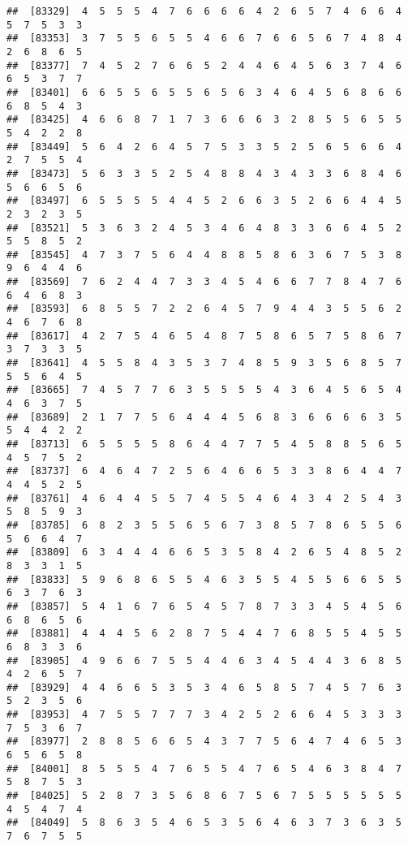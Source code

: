 \documentclass[
]{book}
\begin{document}
\begin{verbatim}
##  [83329]  4  5  5  5  4  7  6  6  6  6  4  2  6  5  7  4  6  6  4  5  7  5  3  3
##  [83353]  3  7  5  5  6  5  5  4  6  6  7  6  6  5  6  7  4  8  4  2  6  8  6  5
##  [83377]  7  4  5  2  7  6  6  5  2  4  4  6  4  5  6  3  7  4  6  6  5  3  7  7
##  [83401]  6  6  5  5  6  5  5  6  5  6  3  4  6  4  5  6  8  6  6  6  8  5  4  3
##  [83425]  4  6  6  8  7  1  7  3  6  6  6  3  2  8  5  5  6  5  5  5  4  2  2  8
##  [83449]  5  6  4  2  6  4  5  7  5  3  3  5  2  5  6  5  6  6  4  2  7  5  5  4
##  [83473]  5  6  3  3  5  2  5  4  8  8  4  3  4  3  3  6  8  4  6  5  6  6  5  6
##  [83497]  6  5  5  5  5  4  4  5  2  6  6  3  5  2  6  6  4  4  5  2  3  2  3  5
##  [83521]  5  3  6  3  2  4  5  3  4  6  4  8  3  3  6  6  4  5  2  5  5  8  5  2
##  [83545]  4  7  3  7  5  6  4  4  8  8  5  8  6  3  6  7  5  3  8  9  6  4  4  6
##  [83569]  7  6  2  4  4  7  3  3  4  5  4  6  6  7  7  8  4  7  6  6  4  6  8  3
##  [83593]  6  8  5  5  7  2  2  6  4  5  7  9  4  4  3  5  5  6  2  4  6  7  6  8
##  [83617]  4  2  7  5  4  6  5  4  8  7  5  8  6  5  7  5  8  6  7  3  7  3  3  5
##  [83641]  4  5  5  8  4  3  5  3  7  4  8  5  9  3  5  6  8  5  7  5  5  6  4  5
##  [83665]  7  4  5  7  7  6  3  5  5  5  5  4  3  6  4  5  6  5  4  4  6  3  7  5
##  [83689]  2  1  7  7  5  6  4  4  4  5  6  8  3  6  6  6  6  3  5  5  4  4  2  2
##  [83713]  6  5  5  5  5  8  6  4  4  7  7  5  4  5  8  8  5  6  5  4  5  7  5  2
##  [83737]  6  4  6  4  7  2  5  6  4  6  6  5  3  3  8  6  4  4  7  4  4  5  2  5
##  [83761]  4  6  4  4  5  5  7  4  5  5  4  6  4  3  4  2  5  4  3  5  8  5  9  3
##  [83785]  6  8  2  3  5  5  6  5  6  7  3  8  5  7  8  6  5  5  6  5  6  6  4  7
##  [83809]  6  3  4  4  4  6  6  5  3  5  8  4  2  6  5  4  8  5  2  8  3  3  1  5
##  [83833]  5  9  6  8  6  5  5  4  6  3  5  5  4  5  5  6  6  5  5  6  3  7  6  3
##  [83857]  5  4  1  6  7  6  5  4  5  7  8  7  3  3  4  5  4  5  6  6  8  6  5  6
##  [83881]  4  4  4  5  6  2  8  7  5  4  4  7  6  8  5  5  4  5  5  6  8  3  3  6
##  [83905]  4  9  6  6  7  5  5  4  4  6  3  4  5  4  4  3  6  8  5  4  2  6  5  7
##  [83929]  4  4  6  6  5  3  5  3  4  6  5  8  5  7  4  5  7  6  3  5  2  3  5  6
##  [83953]  4  7  5  5  7  7  7  3  4  2  5  2  6  6  4  5  3  3  3  7  5  3  6  7
##  [83977]  2  8  8  5  6  6  5  4  3  7  7  5  6  4  7  4  6  5  3  6  5  6  5  8
##  [84001]  8  5  5  5  4  7  6  5  5  4  7  6  5  4  6  3  8  4  7  5  8  7  5  3
##  [84025]  5  2  8  7  3  5  6  8  6  7  5  6  7  5  5  5  5  5  5  4  5  4  7  4
##  [84049]  5  8  6  3  5  4  6  5  3  5  6  4  6  3  7  3  6  3  5  7  6  7  5  5

\end{verbatim}
\end{document}
